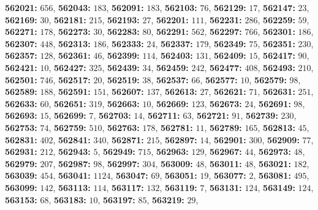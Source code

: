 \textsf{\bfseries 562021:} $656$, \textsf{\bfseries 562043:} $183$, \textsf{\bfseries 562091:} $183$, \textsf{\bfseries 562103:} $76$, \textsf{\bfseries 562129:} $17$, \textsf{\bfseries 562147:} $23$, \textsf{\bfseries 562169:} $30$, \textsf{\bfseries 562181:} $215$, \textsf{\bfseries 562193:} $27$, \textsf{\bfseries 562201:} $111$, \textsf{\bfseries 562231:} $286$, \textsf{\bfseries 562259:} $59$, \textsf{\bfseries 562271:} $178$, \textsf{\bfseries 562273:} $30$, \textsf{\bfseries 562283:} $80$, \textsf{\bfseries 562291:} $562$, \textsf{\bfseries 562297:} $766$, \textsf{\bfseries 562301:} $186$, \textsf{\bfseries 562307:} $448$, \textsf{\bfseries 562313:} $186$, \textsf{\bfseries 562333:} $24$, \textsf{\bfseries 562337:} $179$, \textsf{\bfseries 562349:} $75$, \textsf{\bfseries 562351:} $230$, \textsf{\bfseries 562357:} $128$, \textsf{\bfseries 562361:} $46$, \textsf{\bfseries 562399:} $114$, \textsf{\bfseries 562403:} $131$, \textsf{\bfseries 562409:} $15$, \textsf{\bfseries 562417:} $90$, \textsf{\bfseries 562421:} $10$, \textsf{\bfseries 562427:} $325$, \textsf{\bfseries 562439:} $34$, \textsf{\bfseries 562459:} $242$, \textsf{\bfseries 562477:} $408$, \textsf{\bfseries 562493:} $210$, \textsf{\bfseries 562501:} $746$, \textsf{\bfseries 562517:} $20$, \textsf{\bfseries 562519:} $38$, \textsf{\bfseries 562537:} $66$, \textsf{\bfseries 562577:} $10$, \textsf{\bfseries 562579:} $98$, \textsf{\bfseries 562589:} $188$, \textsf{\bfseries 562591:} $151$, \textsf{\bfseries 562607:} $137$, \textsf{\bfseries 562613:} $27$, \textsf{\bfseries 562621:} $71$, \textsf{\bfseries 562631:} $251$, \textsf{\bfseries 562633:} $60$, \textsf{\bfseries 562651:} $319$, \textsf{\bfseries 562663:} $10$, \textsf{\bfseries 562669:} $123$, \textsf{\bfseries 562673:} $24$, \textsf{\bfseries 562691:} $98$, \textsf{\bfseries 562693:} $15$, \textsf{\bfseries 562699:} $7$, \textsf{\bfseries 562703:} $14$, \textsf{\bfseries 562711:} $63$, \textsf{\bfseries 562721:} $91$, \textsf{\bfseries 562739:} $230$, \textsf{\bfseries 562753:} $74$, \textsf{\bfseries 562759:} $510$, \textsf{\bfseries 562763:} $178$, \textsf{\bfseries 562781:} $11$, \textsf{\bfseries 562789:} $165$, \textsf{\bfseries 562813:} $45$, \textsf{\bfseries 562831:} $402$, \textsf{\bfseries 562841:} $340$, \textsf{\bfseries 562871:} $215$, \textsf{\bfseries 562897:} $14$, \textsf{\bfseries 562901:} $300$, \textsf{\bfseries 562909:} $77$, \textsf{\bfseries 562931:} $212$, \textsf{\bfseries 562943:} $5$, \textsf{\bfseries 562949:} $715$, \textsf{\bfseries 562963:} $129$, \textsf{\bfseries 562967:} $44$, \textsf{\bfseries 562973:} $48$, \textsf{\bfseries 562979:} $207$, \textsf{\bfseries 562987:} $98$, \textsf{\bfseries 562997:} $304$, \textsf{\bfseries 563009:} $48$, \textsf{\bfseries 563011:} $48$, \textsf{\bfseries 563021:} $182$, \textsf{\bfseries 563039:} $454$, \textsf{\bfseries 563041:} $1124$, \textsf{\bfseries 563047:} $69$, \textsf{\bfseries 563051:} $19$, \textsf{\bfseries 563077:} $2$, \textsf{\bfseries 563081:} $495$, \textsf{\bfseries 563099:} $142$, \textsf{\bfseries 563113:} $114$, \textsf{\bfseries 563117:} $132$, \textsf{\bfseries 563119:} $7$, \textsf{\bfseries 563131:} $124$, \textsf{\bfseries 563149:} $124$, \textsf{\bfseries 563153:} $68$, \textsf{\bfseries 563183:} $10$, \textsf{\bfseries 563197:} $85$, \textsf{\bfseries 563219:} $29$, 

